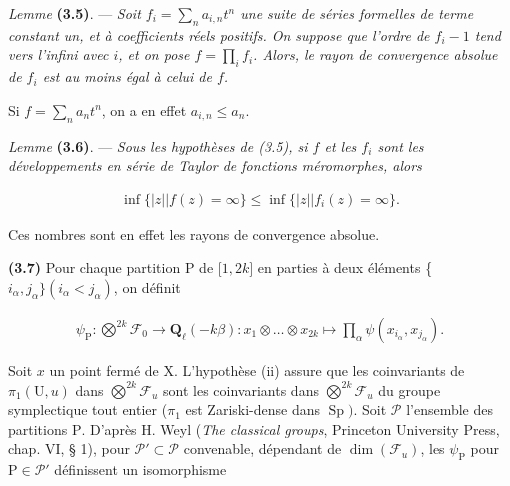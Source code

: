 \documentclass[10pt,leqno]{article}
\begin{document}
\noindent \emph{Lemme} \textbf{(3.5)}. — {\itshape Soit \(f_{i}=\sum _{n} a_{i,n}t^{n}\) une suite de séries formelles de terme constant un, et à coefficients réels positifs. On suppose que l’ordre de \(f_{i}- 1\) tend vers l’infini avec \(i\), et on pose \(f=\prod _{i} f_{i}\). Alors, le rayon de convergence absolue de \(f_{i}\) est au moins égal à celui de \(f\).}\par

\noindent Si \(f=\sum _{n} a_{n} t^{n}\), on a en effet \(a_{i,n}\leq a_{n}\).\par

\noindent \emph{Lemme} \textbf{(3.6)}. — {\itshape Sous les hypothèses de (3.5), si \(f\) et les \(f_{i}\) sont les développements en série de Taylor de fonctions méromorphes, alors}\par

\begin{equation*}\begin{gathered}\operatorname{inf}\{|z| | f(z)=\infty \} \leq  \operatorname{inf}\{|z| | f_{i}(z)=\infty \}.\end{gathered}\end{equation*}

\noindent Ces nombres sont en effet les rayons de convergence absolue.\par

\clearpage

\label{physical-14}

\noindent \textbf{(3.7)} Pour chaque partition \(\mathrm{P}\) de [\(1,2k]\) en parties à deux éléments \{\(i_{\alpha },j_{\alpha }\} (i_{\alpha }<j_{\alpha })\), on définit\par

\begin{equation*}\begin{gathered}\psi _{\mathrm{P}} : \bigotimes\limits^{2k}\mathcal{F} _{0} \longrightarrow  \mathbf{Q}_{\ell }(- k\beta ) : x_{1}\otimes \ldots \otimes x_{2k} \longmapsto  \prod _{\alpha } \psi (x_{i_{\alpha }},x_{j_{\alpha }}).\end{gathered}\end{equation*}

\noindent Soit \(x\) un point fermé de \(\mathrm{X}\). L’hypothèse (ii) assure que les coinvariants de \(\pi _{1}(\mathrm{U},u)\) dans \(\bigotimes\limits^{2k}\mathcal{F} _{u}\) sont les coinvariants dans \(\bigotimes\limits^{2k}\mathcal{F} _{u}\) du groupe symplectique tout entier (\(\pi _{1}\) est Zariski-dense dans \(\operatorname{Sp})\). Soit \(\mathcal{P} \) l’ensemble des partitions \(\mathrm{P}\). D’après \(\mathrm{H}\). Weyl (\emph{The classical groups}, Princeton University Press, chap. VI, § 1), pour \(\mathcal{P} '\subset \mathcal{P} \) convenable, dépendant de \(\operatorname{dim}(\mathcal{F} _{u})\), les \(\psi _{\mathrm{P}}\) pour \(\mathrm{P}\in \mathcal{P} '\) définissent un isomorphisme\par
\end{document}
